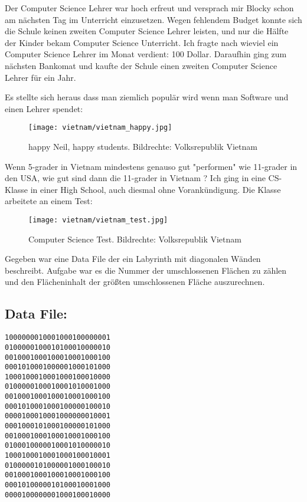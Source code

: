 Der Computer Science Lehrer war hoch erfreut und versprach mir Blocky schon am nächsten Tag im Unterricht einzusetzen. Wegen fehlendem Budget konnte sich die Schule keinen zweiten Computer Science Lehrer leisten, und nur die Hälfte der Kinder bekam Computer Science Unterricht. Ich fragte nach wieviel ein Computer Science Lehrer im Monat verdient: 100 Dollar. Daraufhin ging zum nächsten Bankomat und kaufte der Schule einen zweiten Computer Science Lehrer für ein Jahr.

Es stellte sich heraus dass man ziemlich populär wird wenn man Software und einen Lehrer spendet:
\begin{figure}
\texttt{[image: vietnam/vietnam\_happy.jpg]}
\caption{happy Neil, happy students. Bildrechte: Volksrepublik Vietnam}
\end{figure}

Wenn 5-grader in Vietnam mindestens genauso gut "performen" wie 11-grader in den USA, wie gut sind dann die 11-grader in Vietnam ? Ich ging in eine CS-Klasse in einer High School, auch diesmal ohne Vorankündigung. Die Klasse arbeitete an einem Test:

\begin{figure}
\texttt{[image: vietnam/vietnam\_test.jpg]}
\caption{Computer Science Test. Bildrechte: Volksrepublik Vietnam}
\end{figure}

Gegeben war eine Data File der ein Labyrinth mit diagonalen Wänden beschreibt. Aufgabe war es die Nummer der umschlossenen Flächen zu zählen und den Flächeninhalt der größten umschlossenen Fläche auszurechnen.

\subsection*{Data File:}
\large
\texttt{1000000010001000100000001 \\
0100000100010100010000010 \\
0010001000100010001000100 \\
0001010001000001000101000 \\
1000100010001000100010000 \\
0100000100010001010001000 \\
0010001000100010001000100 \\
0001010001000100000100010 \\
0000100010001000000010001 \\
0001000101000100000101000 \\
0010001000100010001000100 \\
0100010000010001010000010 \\
1000100010001000100010001 \\
0100000101000001000100010 \\
0010001000100010001000100 \\
0001010000010100010001000 \\
0000100000001000100010000 \\
}
\normalsize 


